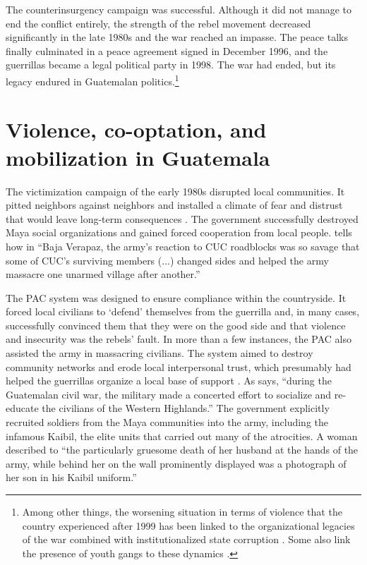 \documentclass[12pt, notitlepage]{article}
\begin{document}
The counterinsurgency campaign was successful.
Although it did not manage to end the conflict entirely, the strength of the rebel movement decreased significantly in the late 1980s and the war reached an impasse.
The peace talks finally culminated in a peace agreement signed in December 1996, and the guerrillas became a legal political party in 1998.
The war had ended, but its legacy endured in Guatemalan politics.\footnote{Among other things, the worsening situation in terms of violence that the country experienced after 1999 has been linked to the organizational legacies of the war combined with institutionalized state corruption \citep{Peacock:2003tt, Booth:2010wd}. Some also link the presence of youth gangs to these dynamics \citep{Levenson:2013tm}.}

\section*{Violence, co-optation, and mobilization in Guatemala}

The victimization campaign of the early 1980s disrupted local communities. It pitted neighbors against neighbors and installed a climate of fear and distrust that would leave long-term consequences \citep{Burrell:2013aa}.
The government successfully destroyed Maya social organizations and gained forced cooperation from local people.
\citet[101]{Stoll:1999aa} tells how in ``Baja Verapaz, the army's reaction to CUC roadblocks was so savage that some of CUC's surviving members (...) changed sides and helped the army massacre one unarmed village after another.''

The PAC system was designed to ensure compliance within the countryside.
It forced local civilians to `defend' themselves from the guerrilla and, in many cases, successfully convinced them that they were on the good side and that violence and insecurity was the rebels' fault.
In more than a few instances, the PAC also assisted the army in massacring civilians.
The system aimed to destroy community networks and erode local interpersonal trust, which presumably had helped the guerrillas organize a local base of support \citep{SaenzdeTejada:2004aa}.
As \citet[641]{Bateson:2017aa} says, ``during the Guatemalan civil war, the military made a concerted effort to socialize and re-educate the civilians of the Western Highlands.''
The government explicitly recruited soldiers from the Maya communities into the army, including the infamous Kaibil, the elite units that carried out many of the atrocities.
A woman described to \citet[112]{Green:1995aa} ``the particularly gruesome death of her husband at the hands of the army, while behind her on the wall prominently displayed was a photograph of her son in his Kaibil uniform.''
\end{document}
